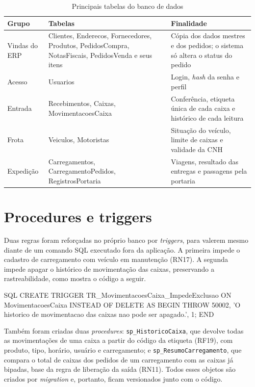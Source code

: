 \begin{table}[htbp]
\centering
\caption{Principais tabelas do banco de dados}
\label{tab:tabelas}
\footnotesize
\begin{tabular}{|p{2.6cm}|p{6.2cm}|p{5.6cm}|}
\hline
\textbf{Grupo} & \textbf{Tabelas} & \textbf{Finalidade} \\ \hline
Vindas do ERP & Clientes, Enderecos, Fornecedores, Produtos, PedidosCompra, NotasFiscais, PedidosVenda e seus itens & Cópia dos dados mestres e dos pedidos; o sistema só altera o status do pedido \\ \hline
Acesso & Usuarios & Login, \textit{hash} da senha e perfil \\ \hline
Entrada & Recebimentos, Caixas, MovimentacoesCaixa & Conferência, etiqueta única de cada caixa e histórico de cada leitura \\ \hline
Frota & Veiculos, Motoristas & Situação do veículo, limite de caixas e validade da CNH \\ \hline
Expedição & Carregamentos, CarregamentoPedidos, RegistrosPortaria & Viagens, resultado das entregas e passagens pela portaria \\ \hline
\end{tabular}
\end{table}

\section{Procedures e triggers}

Duas regras foram reforçadas no próprio banco por \textit{triggers}, para valerem mesmo diante de um comando SQL executado fora da aplicação. A primeira impede o cadastro de carregamento com veículo em manutenção (RN17). A segunda impede apagar o histórico de movimentação das caixas, preservando a rastreabilidade, como mostra o código a seguir.

\begin{codeblock}{SQL}
CREATE TRIGGER TR_MovimentacoesCaixa_ImpedeExclusao
ON MovimentacoesCaixa
INSTEAD OF DELETE
AS
BEGIN
    THROW 50002, 'O historico de movimentacao das caixas nao pode ser apagado.', 1;
END
\end{codeblock}

Também foram criadas duas \textit{procedures}: \texttt{sp\_HistoricoCaixa}, que devolve todas as movimentações de uma caixa a partir do código da etiqueta (RF19), com produto, tipo, horário, usuário e carregamento; e \texttt{sp\_ResumoCarregamento}, que compara o total de caixas dos pedidos de um carregamento com as caixas já bipadas, base da regra de liberação da saída (RN11). Todos esses objetos são criados por \textit{migration} e, portanto, ficam versionados junto com o código.

